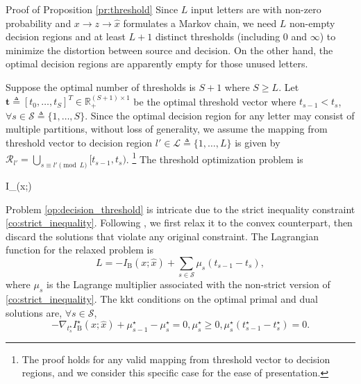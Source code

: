\documentclass[journal]{IEEEtran}
\begin{document}
\begin{appendix}
	\begin{subsection}{Proof of Proposition \ref{pr:threshold}}
		Since $L$ input letters are with non-zero probability and $x \to z \to \hat{x}$ formulates a Markov chain, we need $L$ non-empty decision regions and at least $L+1$ distinct thresholds (including \num{0} and $\infty$) to minimize the distortion between source and decision.
		On the other hand, the optimal decision regions are apparently empty for those unused letters.

		Suppose the optimal number of thresholds is $S+1$ where $S \ge L$.
		Let $\boldsymbol{t} \triangleq [t_0,\ldots,t_S]^T \in \mathbb{R}_{+}^{(S+1) \times 1}$ be the optimal threshold vector where $t_{s-1} < t_s$, $\forall s \in \mathcal{S} \triangleq \{1,\ldots,S\}$.
		Since the optimal decision region for any letter may consist of multiple partitions, without loss of generality, we assume the mapping from threshold vector to decision region $l' \in \mathcal{L} \triangleq \{1,\ldots,L\}$ is given by $\mathcal{R}_{l'} = \bigcup_{s \equiv l' \pmod L} [t_{s-1},t_s)$.
		\footnote{
			The proof holds for any valid mapping from threshold vector to decision regions, and we consider this specific case for the ease of presentation.
		}
		The threshold optimization problem is
		\begin{maxi!}
			{}{I_{}(x;)}{\label{op:decision_threshold}}{\label{ob:backscatter_mutual_information}}
		\end{maxi!}

		Problem \eqref{op:decision_threshold} is intricate due to the strict inequality constraint \eqref{co:strict_inequality}.
		Following \cite{Nguyen2020}, we first relax it to the convex counterpart, then discard the solutions that violate any original constraint.
		The Lagrangian function for the relaxed problem is
		\begin{equation}
			L = - I_{\mathrm{B}}(x;\hat{x}) + \sum_{s \in \mathcal{S}} \mu_s (t_{s-1} - t_s),
		\end{equation}
		where $\mu_s$ is the Lagrange multiplier associated with the non-strict version of \eqref{co:strict_inequality}.
		The \gls{kkt} conditions on the optimal primal and dual solutions are, $\forall s \in \mathcal{S}$,
		\begin{subequations}
			\label{eq:kkt_thresholding}
			\begin{equation}
				- \nabla_{t_s^\star} I^\star_{\mathrm{B}}(x;\hat{x}) + \mu_{s-1}^\star - \mu_s^\star = 0,
				\label{eq:stationarity}
			\end{equation}
			\begin{equation}
				\mu_s^\star \ge 0,
				\label{eq:dual_feasibility}
			\end{equation}
			\begin{equation}
				\mu_s^\star (t_{s-1}^\star - t_s^\star) = 0.
				\label{eq:complementary_slackness}
			\end{equation}


\end{subequations}
\end{subsection}
\end{appendix}
\end{document}
